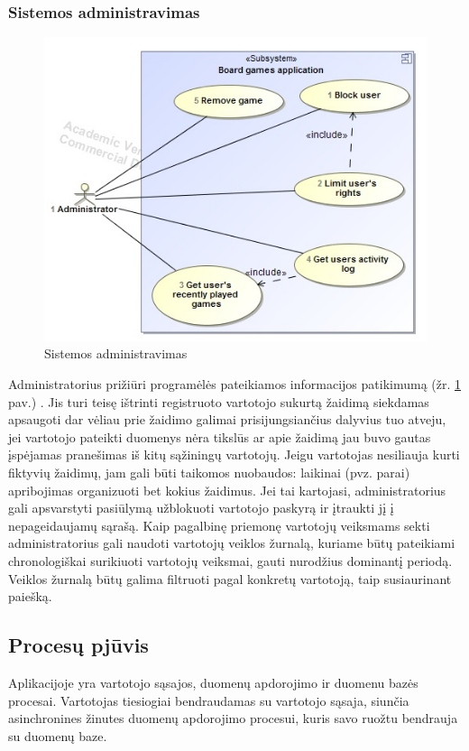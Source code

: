 \documentclass{VUMIFPSkursinis}
\begin{document}
	\subsubsection{Sistemos administravimas}
		\begin{figure}[H]
			\centering
			\includegraphics[scale=0.6]{img/UzduociuDiagrama3}
			\caption{Sistemos administravimas}
			\label{img:UzduociuDiagrama3}
		\end{figure}
		Administratorius prižiūri programėlės pateikiamos informacijos patikimumą (žr. \ref{img:UzduociuDiagrama3} pav.) . Jis turi teisę ištrinti registruoto vartotojo sukurtą žaidimą siekdamas apsaugoti dar vėliau prie žaidimo galimai prisijungsiančius dalyvius tuo atveju, jei vartotojo pateikti duomenys nėra tikslūs ar apie žaidimą jau buvo gautas įspėjamas pranešimas iš kitų sąžiningų vartotojų. Jeigu vartotojas nesiliauja kurti fiktyvių žaidimų, jam gali būti taikomos nuobaudos: laikinai (pvz. parai) apribojimas organizuoti bet kokius žaidimus. Jei tai kartojasi, administratorius gali apsvarstyti pasiūlymą užblokuoti vartotojo paskyrą ir įtraukti jį į nepageidaujamų sąrašą. Kaip pagalbinę priemonę vartotojų veiksmams sekti administratorius gali naudoti vartotojų veiklos žurnalą, kuriame būtų pateikiami chronologiškai surikiuoti vartotojų veiksmai, gauti nurodžius dominantį periodą. Veiklos žurnalą būtų galima filtruoti pagal konkretų vartotoją, taip susiaurinant paiešką.		


\subsection{Procesų pjūvis}
Aplikacijoje yra vartotojo sąsajos, duomenų apdorojimo ir duomenu bazės procesai. 
Vartotojas tiesiogiai bendraudamas su vartotojo sąsaja, siunčia asinchronines 
žinutes duomenų apdorojimo procesui, kuris savo ruožtu bendrauja su duomenų baze.
\end{document}

